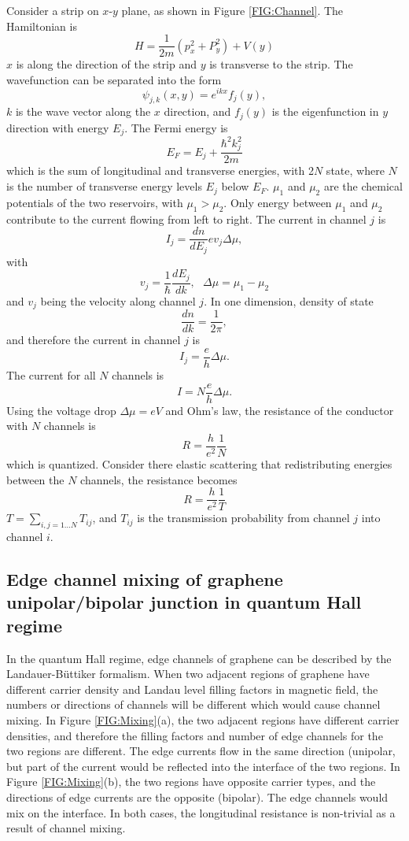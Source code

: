 \documentclass[pdflatex, sectionletters, 12pt]{pittetd}    %
\begin{document}
Consider a strip on $x$-$y$ plane, as shown in Figure \ref{FIG:Channel}. The Hamiltonian is
$$
H = \frac{1}{2m}\left(p_x^2 + P_y^2\right) + V(y)
$$ 
$x$ is along the direction of the strip and $y$ is transverse to the strip. The wavefunction can be separated into the form
$$
\psi_{j, k}(x, y) = e^{ikx} f_j(y),
$$
$k$ is the wave vector along the $x$ direction, and $f_j(y)$ is the eigenfunction in $y$ direction with energy $E_j$. The Fermi energy is 
$$
E_F = E_j + \frac{\hbar^2 k_j^2}{2m}
$$
which is the sum of longitudinal and transverse energies, with 2$N$ state, where $N$ is the number of transverse energy levels $E_j$ below $E_F$. $\mu_1$ and $\mu_2$ are the chemical potentials of the two reservoirs, with $\mu_1 > \mu_2$. Only energy between $\mu_1$ and $\mu_2$ contribute to the current flowing from left to right. The current in channel $j$ is 
$$
I_j = \frac{dn}{dE_j}ev_j\Delta\mu,
$$
with 
$$
v_j = \frac{1}{\hbar}\frac{dE_j}{dk}, \ \ \ \Delta \mu = \mu_1 - \mu_2
$$
and $v_j$ being the velocity along channel $j$. In one dimension, density of state
$$
\frac{dn}{dk} = \frac{1}{2\pi},
$$
and therefore the current in channel $j$ is
$$
I_j = \frac{e}{h}\Delta\mu.
$$
The current for all $N$ channels is
$$I = N\frac{e}{h}\Delta\mu.$$
Using the voltage drop $\Delta \mu = eV$ and Ohm's law, the resistance of the conductor with $N$ channels is
$$
R = \frac{h}{e^2}\frac{1}{N}
$$ 
which is quantized. Consider there elastic scattering that redistributing energies between the $N$ channels, the resistance becomes\cite{buttiker1988absence}
$$
R = \frac{h}{e^2}\frac{1}{T}
$$
$T = \sum_{i,j=1\ldots N} T_{ij}$, and $T_{ij}$ is the transmission probability from channel $j$ into channel $i$. 

\subsection{Edge channel mixing of graphene unipolar/bipolar junction in quantum Hall regime}

In the quantum Hall regime, edge channels of graphene can be described by the Landauer-B{\"u}ttiker formalism. When two adjacent regions of graphene have different carrier density and Landau level filling factors in magnetic field, the numbers or directions of channels will be different which would cause channel mixing. In Figure \ref{FIG:Mixing}(a), the two adjacent regions have different carrier densities, and therefore the filling factors and number of edge channels for the two regions are different. The edge currents flow in the same direction (unipolar, but part of the current would be reflected into the interface of the two regions. In Figure \ref{FIG:Mixing}(b), the two regions have opposite carrier types, and the directions of edge currents are the opposite (bipolar). The edge channels would mix on the interface. In both cases, the longitudinal resistance is non-trivial as a result of channel mixing.
\end{document}
